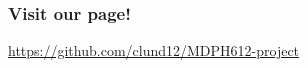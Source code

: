 \documentclass{beamer}
\begin{document}
\begin{frame}
\begin{columns}
\begin{column}{0.5\textwidth}
\begin{figure}
            \end{figure}
        \end{column}
    \end{columns}

                
\end{frame}

\begin{frame}

    \frametitle{Visit our page!}

    \centering
    \url{https://github.com/clund12/MDPH612-project}

\end{frame}
\end{document}
